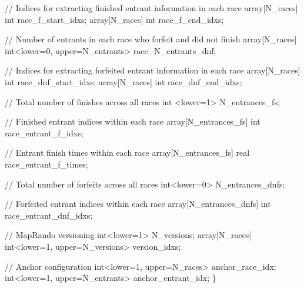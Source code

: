 \documentclass[
  letterpaper,
  DIV=11,
  numbers=noendperiod]{scrartcl}
\newenvironment{Shaded}{\begin{snugshade}}{\end{snugshade}}
\newcommand{\CommentTok}[1]{\textcolor[rgb]{0.37,0.37,0.37}{#1}}
\newcommand{\DataTypeTok}[1]{\textcolor[rgb]{0.68,0.00,0.00}{#1}}
\newcommand{\DecValTok}[1]{\textcolor[rgb]{0.68,0.00,0.00}{#1}}
\newcommand{\KeywordTok}[1]{\textcolor[rgb]{0.00,0.23,0.31}{#1}}
\newcommand{\NormalTok}[1]{\textcolor[rgb]{0.00,0.23,0.31}{#1}}
\begin{document}
\begin{codelisting}
\begin{Shaded}
\begin{Highlighting}[]
  \CommentTok{// Indices for extracting finished entrant information in each race}
  \DataTypeTok{array}\NormalTok{[N\_races] }\DataTypeTok{int}\NormalTok{ race\_f\_start\_idxs;}
  \DataTypeTok{array}\NormalTok{[N\_races] }\DataTypeTok{int}\NormalTok{ race\_f\_end\_idxs;}

  \CommentTok{// Number of entrants in each race who forfeit and did not finish}
  \DataTypeTok{array}\NormalTok{[N\_races] }\DataTypeTok{int}\NormalTok{\textless{}}\KeywordTok{lower}\NormalTok{=}\DecValTok{0}\NormalTok{, }\KeywordTok{upper}\NormalTok{=N\_entrants\textgreater{} race\_N\_entrants\_dnf;}

  \CommentTok{// Indices for extracting forfeited entrant information in each race}
  \DataTypeTok{array}\NormalTok{[N\_races] }\DataTypeTok{int}\NormalTok{ race\_dnf\_start\_idxs;}
  \DataTypeTok{array}\NormalTok{[N\_races] }\DataTypeTok{int}\NormalTok{ race\_dnf\_end\_idxs;}

  \CommentTok{// Total number of finishes across all races}
  \DataTypeTok{int}\NormalTok{ \textless{}}\KeywordTok{lower}\NormalTok{=}\DecValTok{1}\NormalTok{\textgreater{} N\_entrances\_fs;}

  \CommentTok{// Finished entrant indices within each race}
  \DataTypeTok{array}\NormalTok{[N\_entrances\_fs] }\DataTypeTok{int}\NormalTok{ race\_entrant\_f\_idxs;}

  \CommentTok{// Entrant finish times within each race}
  \DataTypeTok{array}\NormalTok{[N\_entrances\_fs] }\DataTypeTok{real}\NormalTok{ race\_entrant\_f\_times;}

  \CommentTok{// Total number of forfeits across all races}
  \DataTypeTok{int}\NormalTok{\textless{}}\KeywordTok{lower}\NormalTok{=}\DecValTok{0}\NormalTok{\textgreater{} N\_entrances\_dnfs;}

  \CommentTok{// Forfeited entrant indices within each race}
  \DataTypeTok{array}\NormalTok{[N\_entrances\_dnfs] }\DataTypeTok{int}\NormalTok{ race\_entrant\_dnf\_idxs;}

  \CommentTok{// MapRando versioning}
  \DataTypeTok{int}\NormalTok{\textless{}}\KeywordTok{lower}\NormalTok{=}\DecValTok{1}\NormalTok{\textgreater{} N\_versions;}
  \DataTypeTok{array}\NormalTok{[N\_races] }\DataTypeTok{int}\NormalTok{\textless{}}\KeywordTok{lower}\NormalTok{=}\DecValTok{1}\NormalTok{, }\KeywordTok{upper}\NormalTok{=N\_versions\textgreater{} version\_idxs;}

  \CommentTok{// Anchor configuration}
  \DataTypeTok{int}\NormalTok{\textless{}}\KeywordTok{lower}\NormalTok{=}\DecValTok{1}\NormalTok{, }\KeywordTok{upper}\NormalTok{=N\_races\textgreater{} anchor\_race\_idx;}
  \DataTypeTok{int}\NormalTok{\textless{}}\KeywordTok{lower}\NormalTok{=}\DecValTok{1}\NormalTok{, }\KeywordTok{upper}\NormalTok{=N\_entrants\textgreater{} anchor\_entrant\_idx;}
\NormalTok{\}}


\end{Highlighting}
\end{Shaded}
\end{codelisting}
\end{document}
